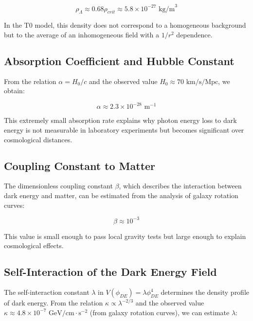 \documentclass[a4paper,12pt]{article}
\begin{document}
\begin{equation}
	\rho_{\Lambda} \approx 0.68 \rho_{crit} \approx 5.8 \times 10^{-27} \text{ kg/m}^3
\end{equation}

In the T0 model, this density does not correspond to a homogeneous background but to the average of an inhomogeneous field with a $1/r^2$ dependence.

\subsection{Absorption Coefficient and Hubble Constant}

From the relation $\alpha = H_0/c$ and the observed value $H_0 \approx 70 \text{ km/s/Mpc}$, we obtain:

\begin{equation}
	\alpha \approx 2.3 \times 10^{-28} \text{ m}^{-1}
\end{equation}

This extremely small absorption rate explains why photon energy loss to dark energy is not measurable in laboratory experiments but becomes significant over cosmological distances.

\subsection{Coupling Constant to Matter}

The dimensionless coupling constant $\beta$, which describes the interaction between dark energy and matter, can be estimated from the analysis of galaxy rotation curves:

\begin{equation}
	\beta \approx 10^{-3}
\end{equation}

This value is small enough to pass local gravity tests but large enough to explain cosmological effects.

\subsection{Self-Interaction of the Dark Energy Field}

The self-interaction constant $\lambda$ in $V(\phi_{DE}) = \lambda \phi_{DE}^4$ determines the density profile of dark energy. From the relation $\kappa \propto \lambda^{-2/3}$ and the observed value $\kappa \approx 4.8 \times 10^{-7} \text{ GeV/cm} \cdot \text{s}^{-2}$ (from galaxy rotation curves), we can estimate $\lambda$:
\end{document}
